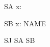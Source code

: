 \documentclass{article}
\begin{document}
\begin{zdirectives}
\end{zdirectives}

\begin{zed}
  [NAME]
\end{zed}
\begin{schema}{SA}
  x: \nat
\end{schema}
\begin{schema}{SB}
  x: NAME
\end{schema}
\begin{schema}{SJ}
  SA \land SB
\end{schema}
\end{document}
